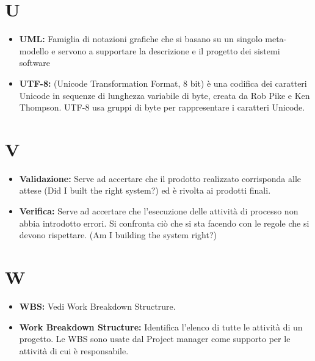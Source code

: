 \documentclass[a4paper]{article}
\begin{document}
	\section*{U}
		\begin{itemize}	
			\item \textbf{UML:} Famiglia di notazioni grafiche che si basano su un singolo meta-modello e servono a supportare la 
			descrizione e il progetto dei sistemi software	
			\item \textbf{UTF-8:} (Unicode Transformation Format, 8 bit) è una codifica dei caratteri Unicode in sequenze 
			di lunghezza variabile di byte, creata da Rob Pike e Ken Thompson. UTF-8 usa gruppi di byte per rappresentare i caratteri Unicode.		
		\end{itemize}
		
	\section*{V}
		\begin{itemize}
			\item \textbf{Validazione:} Serve ad accertare che il prodotto realizzato corrisponda alle attese (Did I 
			built the right system?) ed è rivolta ai prodotti finali.
			\item \textbf{Verifica:} Serve ad accertare che l’esecuzione delle attività di processo non abbia introdotto 
			errori. Si confronta ciò che si sta facendo con le regole che si devono rispettare. (Am I building the system right?)	
		\end{itemize}
		
	\section*{W}
		\begin{itemize}
			\item \textbf{WBS:} Vedi Work Breakdown Structrure.
			\item \textbf{Work Breakdown Structure:} Identifica l'elenco di tutte le attività di un progetto. Le WBS sono 
			usate dal Project manager come supporto per le attività di cui è responsabile.
		\end{itemize}
\end{document}
